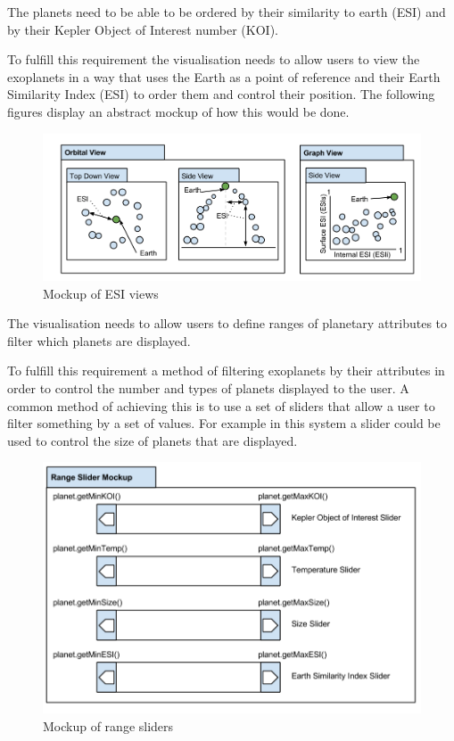 \begin{enumerate}
{\bf
 \item[R3.] The planets need to be able to be ordered by their similarity to
earth (ESI) and by their Kepler Object of Interest number (KOI).}

To fulfill this requirement the visualisation needs to allow users to view the
exoplanets in a way that uses the Earth as a point of reference and their Earth
Similarity Index (ESI) to order them and control their position. The following
figures display an abstract mockup of how this would be done.

\begin{figure}[H]
  \centering
      \includegraphics[width=1\textwidth]{images/mockupESI.png}
  \caption{Mockup of ESI views}  
\end{figure}


{\bf
 \item[R4.] The visualisation needs to allow users to define ranges of planetary
attributes to filter which planets are displayed.}

To fulfill this requirement a method of filtering exoplanets by their attributes
in order to control the number and types of planets displayed to the user. A
common method of achieving this is to use a set of sliders that allow a user to
filter something by a set of values. For example in this system a slider could
be used to control the size of planets that are displayed.

\begin{figure}[H]
  \centering
      \includegraphics[width=.8\textwidth]{images/mockSlider.png}
  \caption{Mockup of range sliders}  
\end{figure}


\end{enumerate}
